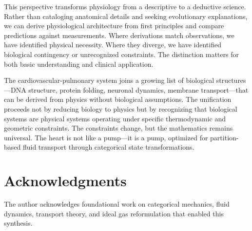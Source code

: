 \documentclass[10pt,twocolumn,a4paper]{article}
\theoremstyle{remark}
\begin{document}
This perspective transforms physiology from a descriptive to a deductive science. Rather than cataloging anatomical details and seeking evolutionary explanations, we can derive physiological architecture from first principles and compare predictions against measurements. Where derivations match observations, we have identified physical necessity. Where they diverge, we have identified biological contingency or unrecognized constraints. The distinction matters for both basic understanding and clinical application.

The cardiovascular-pulmonary system joins a growing list of biological structures—DNA structure, protein folding, neuronal dynamics, membrane transport—that can be derived from physics without biological assumptions. The unification proceeds not by reducing biology to physics but by recognizing that biological systems are physical systems operating under specific thermodynamic and geometric constraints. The constraints change, but the mathematics remains universal. The heart is not like a pump—it is a pump, optimized for partition-based fluid transport through categorical state transformations.

\section*{Acknowledgments}

The author acknowledges foundational work on categorical mechanics, fluid dynamics, transport theory, and ideal gas reformulation that enabled this synthesis.



\end{document}
